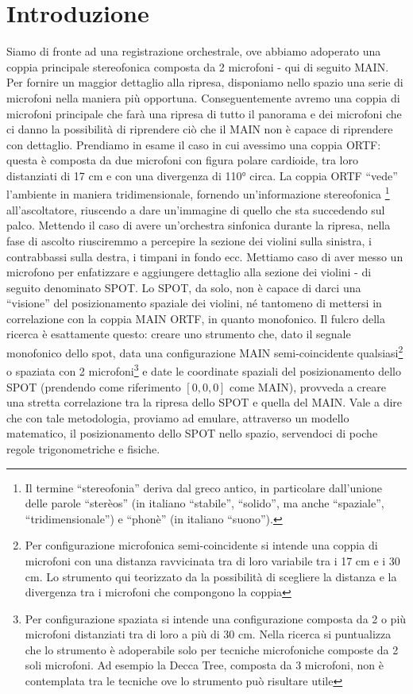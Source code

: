 \documentclass{article}
\begin{document}
\section{Introduzione}
    Siamo di fronte ad una registrazione orchestrale, ove abbiamo adoperato una coppia principale stereofonica composta da 2 microfoni - qui di seguito MAIN. Per fornire un maggior dettaglio alla ripresa, disponiamo nello spazio una serie di microfoni nella maniera più opportuna. Conseguentemente avremo una coppia di microfoni principale che farà una ripresa di tutto il panorama e dei microfoni che ci danno la possibilità di riprendere ciò che il MAIN non è capace di riprendere con dettaglio. Prendiamo in esame il caso in cui avessimo una coppia ORTF: questa è composta da due microfoni con figura polare cardioide, tra loro distanziati di 17 cm e con una divergenza di 110° circa. La coppia ORTF ``vede'' l'ambiente in maniera tridimensionale, fornendo un'informazione stereofonica
    \footnote{Il termine ``stereofonia'' deriva dal greco antico, in particolare dall'unione delle parole ``sterèos'' (in italiano ``stabile'', ``solido'', ma anche ``spaziale'', ``tridimensionale'') e ``phonè'' (in italiano ``suono'').}
    all'ascoltatore, riuscendo a dare un'immagine di quello che sta succedendo sul palco. Mettendo il caso di avere un'orchestra sinfonica durante la ripresa, nella fase di ascolto riusciremmo a percepire la sezione dei violini sulla sinistra, i contrabbassi sulla destra, i timpani in fondo ecc.
    Mettiamo caso di aver messo un microfono per enfatizzare e aggiungere dettaglio alla sezione dei violini - di seguito denominato SPOT. Lo SPOT, da solo, non è capace di darci una ``visione'' del posizionamento spaziale dei violini, né tantomeno di mettersi in correlazione con la coppia MAIN ORTF, in quanto monofonico. Il fulcro della ricerca è esattamente questo: creare uno strumento che, dato il segnale monofonico dello spot, data una configurazione MAIN semi-coincidente qualsiasi\footnote{Per configurazione microfonica semi-coincidente si intende una coppia di microfoni con una distanza ravvicinata tra di loro variabile tra i 17 cm e i 30 cm. Lo strumento qui teorizzato da la possibilità di scegliere la distanza e la divergenza tra i microfoni che compongono la coppia} o spaziata con 2 microfoni\footnote{Per configurazione spaziata si intende una configurazione composta da 2 o più microfoni distanziati tra di loro a più di 30 cm. Nella ricerca si puntualizza che lo strumento è adoperabile solo per tecniche microfoniche composte da 2 soli microfoni. Ad esempio la Decca Tree, composta da 3 microfoni, non è contemplata tra le tecniche ove lo strumento può risultare utile} e date le coordinate spaziali del posizionamento dello SPOT (prendendo come riferimento $[0,0,0]$ come MAIN), provveda a creare una stretta correlazione tra la ripresa dello SPOT e quella del MAIN. Vale a dire che con tale metodologia, proviamo ad emulare, attraverso un modello matematico, il posizionamento dello SPOT nello spazio, servendoci di poche regole trigonometriche e fisiche.
\end{document}
